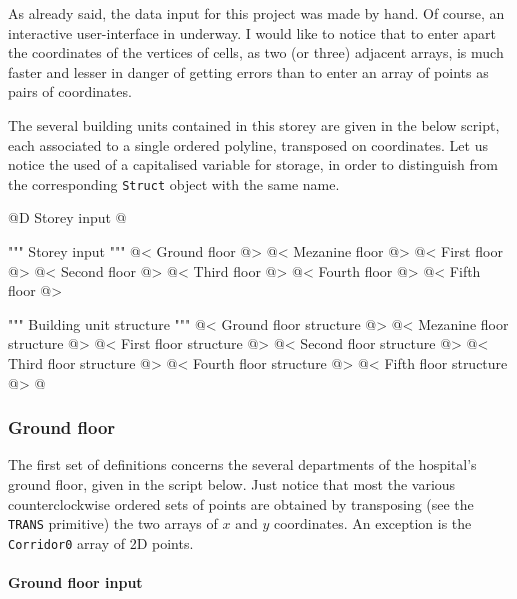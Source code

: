 \documentclass[11pt,oneside]{article}    %
\begin{document}
As already said, the data input for this project was made by hand. Of course, an
interactive user-interface in underway. I would like to notice that to enter apart the 
coordinates of the vertices of cells, as two (or three) adjacent arrays, is much 
faster and lesser in danger of getting errors than to enter an array of points as 
pairs of coordinates.

The several building units contained in this storey are given in the below script,
each associated to a single ordered polyline, transposed on coordinates. Let us notice the used of 
a capitalised variable for storage, in order to distinguish from the corresponding \texttt{Struct}
object with the same name.

@D Storey input
@{""" Storey input """
@< Ground floor @>
@< Mezanine floor @>
@< First floor @>
@< Second floor @>
@< Third floor @>
@< Fourth floor @>
@< Fifth floor @>

""" Building unit structure """
@< Ground floor structure @>
@< Mezanine floor structure @>
@< First floor structure @>
@< Second floor structure @>
@< Third floor structure @>
@< Fourth floor structure @>
@< Fifth floor structure @>
@}


\subsubsection{Ground floor}

The first set of definitions concerns the several departments of the hospital's ground floor,
given in the script below. Just notice that most the various counterclockwise ordered sets of points are obtained by 
transposing (see the \texttt{TRANS} primitive) the two arrays of $x$ and $y$ coordinates. An exception is the \texttt{Corridor0} array of 2D points.

\paragraph{Ground floor input}
\end{document}
